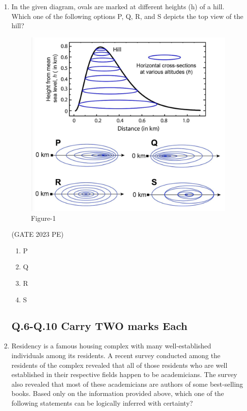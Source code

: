 \documentclass[journal,12pt,onecolumn]{exam}
\theoremstyle{remark}
\begin{document}
\begin{enumerate}
\item In the given diagram, ovals are marked at different heights (h) of a hill. Which one
of the following options P, Q, R, and S depicts the top view of the hill?
\begin{figure}[H]
    \centering
    \includegraphics[width=0.5\linewidth]{figs/fig1.png}
    \caption{Figure-1}
    \label{fig:figs/fig1.png}
\end{figure}

\hfill{(GATE 2023 PE)}\\
\begin{enumerate}
    \item P
    \item Q
    \item R
    \item S
\end{enumerate}
\subsection*{Q.6-Q.10 Carry TWO marks Each}

\item Residency is a famous housing complex with many well-established individuals
among its residents. A recent survey conducted among the residents of the complex
revealed that all of those residents who are well established in their respective fields
happen to be academicians. The survey also revealed that most of these
academicians are authors of some best-selling books.
Based only on the information provided above, which one of the following
statements can be logically inferred with certainty?


\end{enumerate}
\end{document}
